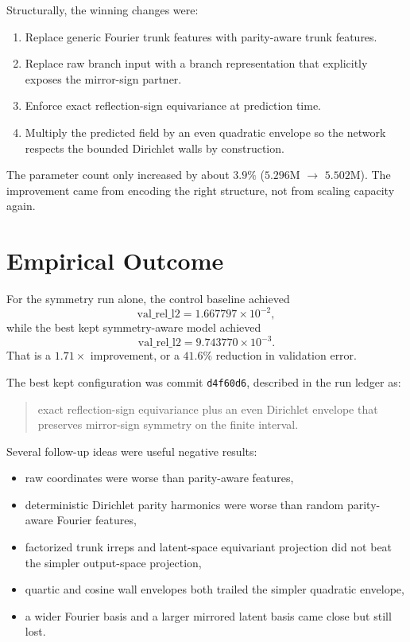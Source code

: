 \documentclass[11pt]{article}
\begin{document}
Structurally, the winning changes were:
\begin{enumerate}[leftmargin=1.5em]
\item Replace generic Fourier trunk features with parity-aware trunk features.
\item Replace raw branch input with a branch representation that explicitly exposes the mirror-sign partner.
\item Enforce exact reflection-sign equivariance at prediction time.
\item Multiply the predicted field by an even quadratic envelope so the network respects the bounded Dirichlet walls by construction.
\end{enumerate}

The parameter count only increased by about $3.9\%$ ($5.296$M $\rightarrow$ $5.502$M). The improvement came from encoding the right structure, not from scaling capacity again.

\section{Empirical Outcome}
For the symmetry run alone, the control baseline achieved
\[
\mathrm{val\_rel\_l2} = 1.667797\times 10^{-2},
\]
while the best kept symmetry-aware model achieved
\[
\mathrm{val\_rel\_l2} = 9.743770\times 10^{-3}.
\]
That is a $1.71\times$ improvement, or a $41.6\%$ reduction in validation error.

The best kept configuration was commit \texttt{d4f60d6}, described in the run ledger as:
\begin{quote}
exact reflection-sign equivariance plus an even Dirichlet envelope that preserves mirror-sign symmetry on the finite interval.
\end{quote}

Several follow-up ideas were useful negative results:
\begin{itemize}[leftmargin=1.5em]
\item raw coordinates were worse than parity-aware features,
\item deterministic Dirichlet parity harmonics were worse than random parity-aware Fourier features,
\item factorized trunk irreps and latent-space equivariant projection did not beat the simpler output-space projection,
\item quartic and cosine wall envelopes both trailed the simpler quadratic envelope,
\item a wider Fourier basis and a larger mirrored latent basis came close but still lost.
\end{itemize}
\end{document}

